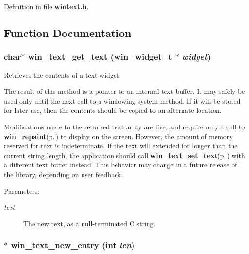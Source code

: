 Definition in file {\bf wintext.h}.

\subsection{Function Documentation}
\subsubsection{\setlength{\rightskip}{0pt plus 5cm}char$\ast$ win\_\-text\_\-get\_\-text ({\bf win\_\-widget\_\-t} $\ast$ {\em widget})}\label{wintext_8h_a3}


Retrieves the contents of a text widget. 

The result of this method is a pointer to an internal text buffer. It may safely be used only until the next call to a windowing system method. If it will be stored for later use, then the contents should be copied to an alternate location.

Modifications made to the returned text array are live, and require only a call to {\bf win\_\-repaint}{\rm (p.\,\pageref{winwidget_8h_a18})} to display on the screen. However, the amount of memory reserved for text is indeterminate. If the text will extended for longer than the current string length, the application should call {\bf win\_\-text\_\-set\_\-text}{\rm (p.\,\pageref{wintext_8h_a2})} with a different text buffer instead. This behavior may change in a future release of the library, depending on user feedback.

\begin{Desc}
\item[Parameters:]
\begin{description}
\item[{\em text}]The new text, as a null-terminated C string. \end{description}
\end{Desc}
\subsubsection{$\ast$ win\_\-text\_\-new\_\-entry (int {\em len})}\label{wintext_8h_a1}


